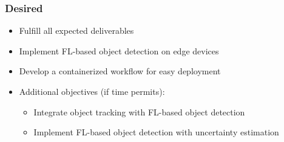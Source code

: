 \documentclass[thesis]{mas_proposal}
\begin{document}
\subsubsection*{Desired}
\begin{itemize}
      \item Fulfill all expected deliverables
      \item Implement FL-based object detection on edge devices
      \item Develop a containerized workflow for easy deployment
      \item Additional objectives (if time permits):
      \begin{itemize}
            \item Integrate object tracking with FL-based object detection
            \item Implement FL-based object detection with uncertainty estimation
      \end{itemize}

\end{itemize}


\nocite{*}

\end{document}
